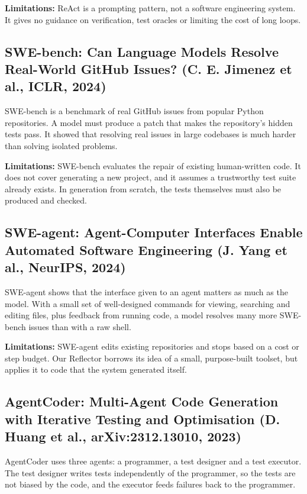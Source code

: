 \documentclass[12pt,a4paper]{report}
\begin{document}
\textbf{Limitations:} ReAct is a prompting pattern, not a software engineering system. It gives no guidance on verification, test oracles or limiting the cost of long loops.

\subsection{SWE-bench: Can Language Models Resolve Real-World GitHub Issues? (C. E. Jimenez et al., ICLR, 2024)}

SWE-bench \cite{jimenez2024swebench} is a benchmark of real GitHub issues from popular Python repositories. A model must produce a patch that makes the repository's hidden tests pass. It showed that resolving real issues in large codebases is much harder than solving isolated problems.

\textbf{Limitations:} SWE-bench evaluates the repair of existing human-written code. It does not cover generating a new project, and it assumes a trustworthy test suite already exists. In generation from scratch, the tests themselves must also be produced and checked.

\subsection{SWE-agent: Agent-Computer Interfaces Enable Automated Software Engineering (J. Yang et al., NeurIPS, 2024)}

SWE-agent \cite{yang2024sweagent} shows that the interface given to an agent matters as much as the model. With a small set of well-designed commands for viewing, searching and editing files, plus feedback from running code, a model resolves many more SWE-bench issues than with a raw shell.

\textbf{Limitations:} SWE-agent edits existing repositories and stops based on a cost or step budget. Our Reflector borrows its idea of a small, purpose-built toolset, but applies it to code that the system generated itself.

\subsection{AgentCoder: Multi-Agent Code Generation with Iterative Testing and Optimisation (D. Huang et al., arXiv:2312.13010, 2023)}

AgentCoder \cite{huang2023agentcoder} uses three agents: a programmer, a test designer and a test executor. The test designer writes tests independently of the programmer, so the tests are not biased by the code, and the executor feeds failures back to the programmer.
\end{document}
